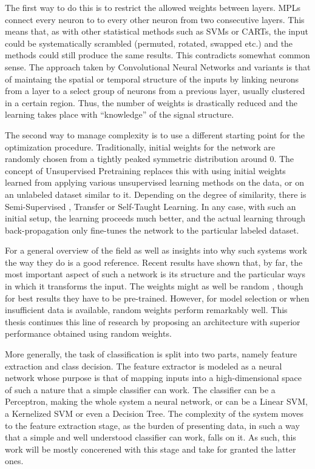 \documentclass[12pt,a4paper,oneside,english]{UPBThesis}
\begin{document}
The first way to do this is to restrict the allowed weights between layers. MPLs connect every neuron to to every other neuron from two consecutive layers. This means that, as with other statistical methods such as SVMs or CARTs, the input could be systematically scrambled (permuted, rotated, swapped etc.) and the methods could still produce the same results. This contradicts somewhat common sense. The approach taken by Convolutional Neural Networks \cite{gradient-based-learning} and variants is that of maintaing the spatial or temporal structure of the inputs by linking neurons from a layer to a select group of neurons from a previous layer, usually clustered in a certain region. Thus, the number of weights is drastically reduced and the learning takes place with ``knowledge'' of the signal structure.

The second way to manage complexity is to use a different starting point for the optimization procedure. Traditionally, initial weights for the network are randomly chosen from a tightly peaked symmetric distribution around $0$. The concept of Unsupervised Pretraining replaces this with using initial weights learned from applying various unsupervised learning methods on the data, or on an unlabeled dataset similar to it. Depending on the degree of similarity, there is Semi-Supervised \cite{text-classification-semi-supervised}, Transfer \cite{text-classification-semi-supervised} or Self-Taught \cite{self-taught-learning} Learning. In any case, with such an initial setup, the learning proceeds much better, and the actual learning through back-propagation only fine-tunes the network to the particular labeled dataset.

For a general overview of the field as well as insights into why such systems work the way they do \cite{learning-deep-architectures-AI} is a good reference. Recent results have shown that, by far, the most important aspect of such a network is its structure and the particular ways in which it transforms the input. The weights might as well be random \cite{random-weights-feature-learning,beyond-simple-features}, though for best results they have to be pre-trained. However, for model selection or when insufficient data is available, random weights perform remarkably well. This thesis continues this line of research by proposing an architecture with superior performance obtained using random weights.

More generally, the task of classification is split into two parts, namely feature extraction and class decision. The feature extractor is modeled as a neural network whose purpose is that of mapping inputs into a high-dimensional space of such a nature that a simple classifier can work. The classifier can be a Perceptron, making the whole system a neural network, or can be a Linear SVM, a Kernelized SVM or even a Decision Tree. The complexity of the system moves to the feature extraction stage, as the burden of presenting data, in such a way that a simple and well understood classifier can work, falls on it. As such, this work will be mostly concerened with this stage and take for granted the latter ones.
\end{document}
